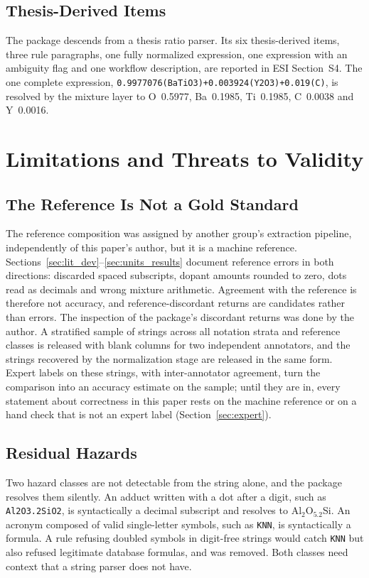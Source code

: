\documentclass[10pt,journal]{IEEEtran}
\begin{document}


\subsection{Thesis-Derived Items}
The package descends from a thesis ratio parser. Its six thesis-derived items, three rule paragraphs, one fully normalized expression, one expression with an ambiguity flag and one workflow description, are reported in ESI Section~S4. The one complete expression, \texttt{0.9977076(BaTiO3)+0.003924(Y2O3)+0.019(C)}, is resolved by the mixture layer to O~0.5977, Ba~0.1985, Ti~0.1985, C~0.0038 and Y~0.0016.

\section{Limitations and Threats to Validity}
\label{sec:limitations}

\subsection{The Reference Is Not a Gold Standard}
The reference composition was assigned by another group's extraction pipeline, independently of this paper's author, but it is a machine reference. Sections~\ref{sec:lit_dev}--\ref{sec:units_results} document reference errors in both directions: discarded spaced subscripts, dopant amounts rounded to zero, dots read as decimals and wrong mixture arithmetic. Agreement with the reference is therefore not accuracy, and reference-discordant returns are candidates rather than errors. The inspection of the package's discordant returns was done by the author. A stratified sample of \NAnnotation{} strings across all notation strata and reference classes is released with blank columns for two independent annotators, and the strings recovered by the normalization stage are released in the same form. Expert labels on these strings, with inter-annotator agreement, turn the comparison into an accuracy estimate on the sample; until they are in, every statement about correctness in this paper rests on the machine reference or on a hand check that is not an expert label (Section~\ref{sec:expert}).

\subsection{Residual Hazards}
Two hazard classes are not detectable from the string alone, and the package resolves them silently. An adduct written with a dot after a digit, such as \texttt{Al2O3.2SiO2}, is syntactically a decimal subscript and resolves to Al$_2$O$_{5.2}$Si. An acronym composed of valid single-letter symbols, such as \texttt{KNN}, is syntactically a formula. A rule refusing doubled symbols in digit-free strings would catch \texttt{KNN} but also refused \NRemovedRuleCorpus{} legitimate database formulas, and was removed. Both classes need context that a string parser does not have.
\end{document}
